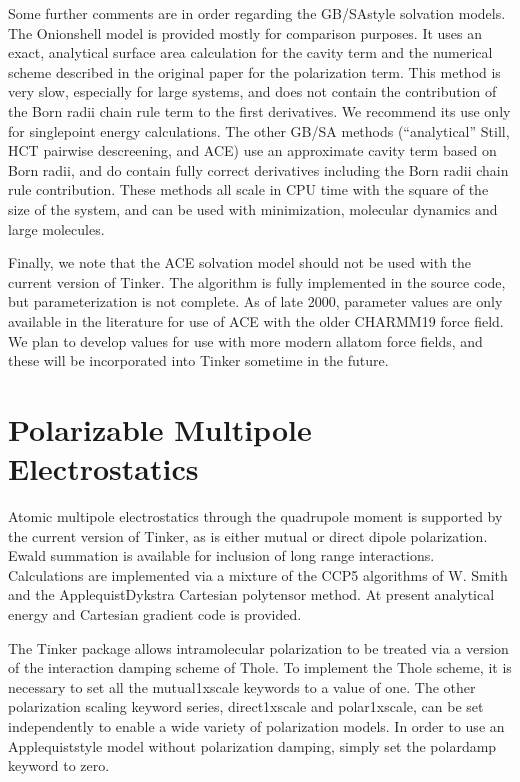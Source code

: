 \documentclass[letterpaper,11pt,english]{sphinxmanual}
\begin{document}
\sphinxAtStartPar
Some further comments are in order regarding the GB/SA\sphinxhyphen{}style solvation models. The Onion\sphinxhyphen{}shell model is provided mostly for comparison purposes. It uses an exact, analytical surface area calculation for the cavity term and the numerical scheme described in the original paper for the polarization term. This method is very slow, especially for large systems, and does not contain the contribution of the Born radii chain rule term to the first derivatives. We recommend its use only for single\sphinxhyphen{}point energy calculations. The other GB/SA methods (“analytical” Still, H\sphinxhyphen{}C\sphinxhyphen{}T pairwise descreening, and ACE) use an approximate cavity term based on Born radii, and do contain fully correct derivatives including the Born radii chain rule contribution. These methods all scale in CPU time with the square of the size of the system, and can be used with minimization, molecular dynamics and large molecules.

\sphinxAtStartPar
Finally, we note that the ACE solvation model should not be used with the current version of Tinker. The algorithm is fully implemented in the source code, but parameterization is not complete. As of late 2000, parameter values are only available in the literature for use of ACE with the older CHARMM19 force field. We plan to develop values for use with more modern all\sphinxhyphen{}atom force fields, and these will be incorporated into Tinker sometime in the future.


\section{Polarizable Multipole Electrostatics}
\label{\detokenize{text/special-features:polarizable-multipole-electrostatics}}
\sphinxAtStartPar
Atomic multipole electrostatics through the quadrupole moment is supported by the current version of Tinker, as is either mutual or direct dipole polarization. Ewald summation is available for inclusion of long range interactions. Calculations are implemented via a mixture of the CCP5 algorithms of W. Smith and the Applequist\sphinxhyphen{}Dykstra Cartesian polytensor method. At present analytical energy and Cartesian gradient code is provided.

\sphinxAtStartPar
The Tinker package allows intramolecular polarization to be treated via a version of the interaction damping scheme of Thole. To implement the Thole scheme, it is necessary to set all the mutual\sphinxhyphen{}1x\sphinxhyphen{}scale keywords to a value of one. The other polarization scaling keyword series, direct\sphinxhyphen{}1x\sphinxhyphen{}scale and polar\sphinxhyphen{}1x\sphinxhyphen{}scale, can be set independently to enable a wide variety of polarization models. In order to use an Applequist\sphinxhyphen{}style model without polarization damping, simply set the polar\sphinxhyphen{}damp keyword to zero.
\end{document}
